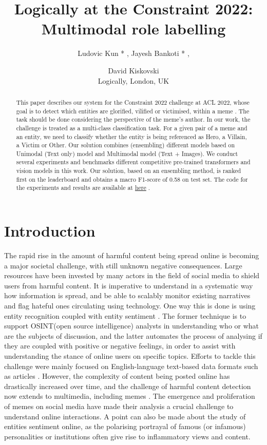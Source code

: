 \documentclass[11pt]{article}
\title{Logically at the Constraint 2022: Multimodal role labelling}
\author{Ludovic Kun * , Jayesh Bankoti * , \and David Kiskovski \\ Logically, London, UK}
\begin{document}
\maketitle
\begin{abstract}


This paper describes our system for the Constraint 2022 challenge at ACL 2022, whose goal is to detect which entities are glorified, vilified or victimised, within a meme . The task should be done considering the perspective of the meme's author. In our work, the challenge is treated
as a multi-class classification task. For a given pair of a meme and an entity, we need to classify whether the entity is being referenced as Hero, a Villain, a Victim or Other. 
Our solution combines (ensembling) different models based on Unimodal (Text only) model and Multimodal model (Text + Images). We conduct several experiments and benchmarks different competitive pre-trained
transformers and vision models in this work. Our solution, based on an ensembling method, is ranked first on the leaderboard and obtains a macro F1-score of 0.58 on test set. The code for the experiments and results are available at \href{https://bitbucket.org/logicallydevs/constraint_2022/src/master/}{here} .




\end{abstract}

\section{Introduction}

The rapid rise in the amount of harmful content being spread online is becoming a major societal challenge, with still unknown negative consequences. Large resources have been invested by many actors in the field of social media to shield users from harmful content. It is imperative to understand in a systematic way how information is spread, and be able to scalably monitor existing narratives and flag hateful ones circulating using technology. One way this is done is using entity recognition coupled with entity sentiment \cite{kiritchenko2021confronting}. The former technique is to support OSINT(open source intelligence) analysts in understanding who or what are the subjects of discussion, and the latter automates the process of analysing if they are coupled with positive or negative feelings, in order to assist with understanding the stance of online users on specific topics. Efforts to tackle this challenge were mainly focused on English-language text-based data formats such as articles \cite{wankhade2022survey}. However, the complexity of content being posted online has drastically increased over time, and the challenge of harmful content detection now extends to multimedia, including memes \cite{alam2021survey}. The emergence and proliferation of memes on social media have made their analysis a crucial challenge to understand online interactions. A point can also be made about the study of entities sentiment online, as the polarising portrayal of famous (or infamous) personalities or institutions often give rise to inflammatory views and content. 
\end{document}
